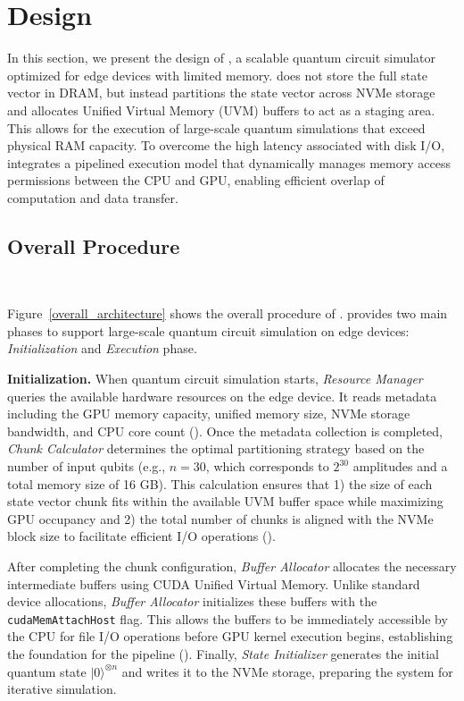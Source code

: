 \section{\EdgeQuantum Design}

In this section, we present the design of \EdgeQuantum, a scalable quantum circuit simulator optimized for edge devices with limited memory. 
\EdgeQuantum does not store the full state vector in DRAM, but instead partitions the state vector across NVMe storage and allocates Unified Virtual Memory (UVM) buffers to act as a staging area. 
This allows for the execution of large-scale quantum simulations that exceed physical RAM capacity. 
To overcome the high latency associated with disk I/O, \EdgeQuantum integrates a pipelined execution model that dynamically manages memory access permissions between the CPU and GPU, enabling efficient overlap of computation and data transfer.

\subsection{Overall Procedure}~\label{design_1}

Figure~\ref{overall_architecture} shows the overall procedure of \EdgeQuantum.
\EdgeQuantum provides two main phases to support large-scale quantum circuit simulation on edge devices: \textit{Initialization} and \textit{Execution} phase.

\noindent\textbf{Initialization.} 
When quantum circuit simulation starts, \textit{Resource Manager} queries the available hardware resources on the edge device.
It reads metadata including the GPU memory capacity, unified memory size, NVMe storage bandwidth, and CPU core count ().
Once the metadata collection is completed, \textit{Chunk Calculator} determines the optimal partitioning strategy based on the number of input qubits (e.g., $n = 30$, which corresponds to $2^{30}$ amplitudes and a total memory size of 16 GB).
This calculation ensures that 1) the size of each state vector chunk fits within the available UVM buffer space while maximizing GPU occupancy and 2) the total number of chunks is aligned with the NVMe block size to facilitate efficient I/O operations ().

After completing the chunk configuration, \textit{Buffer Allocator} allocates the necessary intermediate buffers using CUDA Unified Virtual Memory.
Unlike standard device allocations, \textit{Buffer Allocator} initializes these buffers with the \texttt{cudaMemAttachHost} flag.
This allows the buffers to be immediately accessible by the CPU for file I/O operations before GPU kernel execution begins, establishing the foundation for the pipeline ().
Finally, \textit{State Initializer} generates the initial quantum state $|0\rangle^{\otimes n}$ and writes it to the NVMe storage, preparing the system for iterative simulation.

